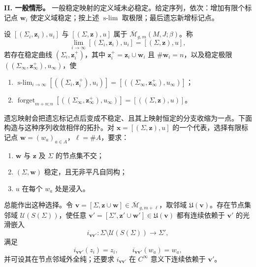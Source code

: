 \textbf{II. 一般情形。}
一般稳定映射的定义域未必稳定。给定序列，依次：增加有限个标记点
$\boldsymbol w_i$ 使定义域稳定；按上述 $\operatorname{s-lim}$ 取极限；最后遗忘新增标记点。

\begin{definition}\label{def:general-stable-map-convergence}
设 $[(\Sigma_i,\boldsymbol z_i),u_i]$ 与
$[(\Sigma,\boldsymbol z),u]$ 属于
$\overline{\mathcal M}_{g,m}(M,J;\beta)$。称
\[
 \lim_{i\to\infty}[(\Sigma_i,\boldsymbol z_i),u_i]
 =[(\Sigma,\boldsymbol z),u],
\]
若存在稳定曲线
$(\Sigma_i,\boldsymbol z_i^+)$，其中
$\boldsymbol z_i^+=\boldsymbol z_i\cup\boldsymbol w_i$ 且
$\#\boldsymbol w_i=n$，以及稳定极限
$((\Sigma_\infty,\boldsymbol z_\infty^+),u_\infty)$，使
\begin{enumerate}[label=(\arabic*)]
 \item
 $\operatorname{s-lim}_{i\to\infty}
 [((\Sigma_i,\boldsymbol z_i^+),u_i)]
 =[((\Sigma_\infty,\boldsymbol z_\infty^+),u_\infty)]$；
 \item
 $\operatorname{forget}_{m+n;n}
 [((\Sigma_\infty,\boldsymbol z_\infty^+),u_\infty)]
 =[((\Sigma,\boldsymbol z),u)]$。
\end{enumerate}
\end{definition}

遗忘映射会把遗忘标记点后变成不稳定、且其上映射恒定的分支收缩为一点。下面构造与这种序列收敛相伴的拓扑。对
$\mathbf x=[(\Sigma,\boldsymbol z),u]$ 的一个代表，选择有限标记点
$\boldsymbol w=(w_a)_{a\in A}$，$\ell=\#A$，要求：

\begin{condition}\label{cond:additional-marked-points}
\begin{enumerate}[label=(\arabic*)]
 \item $\boldsymbol w$ 与 $\boldsymbol z$ 及 $\Sigma$ 的节点集不交；
 \item $(\Sigma,\boldsymbol w)$ 稳定，且无非平凡自同构；
 \item $u$ 在每个 $w_a$ 处是浸入。
\end{enumerate}
\end{condition}

总能作出这种选择。令
$\mathbf v=[\Sigma,\boldsymbol z\cup\boldsymbol w]
\in\overline{\mathcal M}_{g,m+\ell}$，取邻域
$\mathfrak U(\mathbf v)$。存在节点集邻域 $\mathcal U(S(\Sigma))$，使任意
$\mathbf v'=[\Sigma',\boldsymbol z'\cup\boldsymbol w']\in\mathfrak U(\mathbf v)$
都有连续依赖于 $\mathbf v'$ 的光滑嵌入
\begin{equation}
 i_{\mathbf v\mathbf v'}:\Sigma\setminus\mathcal U(S(\Sigma))\longrightarrow\Sigma',
 \label{eq:embedding-stabilized-nearby-domain}
\end{equation}
满足
\begin{equation}
 i_{\mathbf v\mathbf v'}(z_i)=z_i,\qquad i_{\mathbf v\mathbf v'}(w_a)=w_a,
 \label{eq:embedding-preserves-marked-points}
\end{equation}
并可设其在节点邻域外全纯；还要求 $i_{\mathbf v\mathbf v'}$ 在 $C^\infty$ 意义下连续依赖于
$\mathbf v'$。

